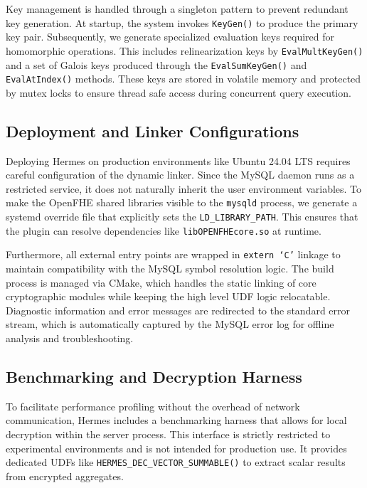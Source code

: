 \documentclass[sigconf,nonacm]{acmart}
\begin{document}
Key management is handled through a singleton pattern to prevent redundant key generation. At startup, the system invokes \texttt{KeyGen()} to produce the primary key pair. Subsequently, we generate specialized evaluation keys required for homomorphic operations. This includes relinearization keys by \texttt{EvalMultKeyGen()} and a set of Galois keys produced through the \texttt{EvalSumKeyGen()} and \texttt{EvalAtIndex()} methods. These keys are stored in volatile memory and protected by mutex locks to ensure thread safe access during concurrent query execution.

\subsection{Deployment and Linker Configurations}

Deploying Hermes on production environments like Ubuntu 24.04 LTS requires careful configuration of the dynamic linker. Since the MySQL daemon runs as a restricted service, it does not naturally inherit the user environment variables. To make the OpenFHE shared libraries visible to the \texttt{mysqld} process, we generate a systemd override file that explicitly sets the \texttt{LD\_LIBRARY\_PATH}. This ensures that the plugin can resolve dependencies like \texttt{libOPENFHEcore.so} at runtime.

Furthermore, all external entry points are wrapped in \texttt{extern `C'} linkage to maintain compatibility with the MySQL symbol resolution logic. The build process is managed via CMake, which handles the static linking of core cryptographic modules while keeping the high level UDF logic relocatable. Diagnostic information and error messages are redirected to the standard error stream, which is automatically captured by the MySQL error log for offline analysis and troubleshooting.

\subsection{Benchmarking and Decryption Harness}

To facilitate performance profiling without the overhead of network communication, Hermes includes a benchmarking harness that allows for local decryption within the server process. This interface is strictly restricted to experimental environments and is not intended for production use. It provides dedicated UDFs like \texttt{HERMES\_DEC\_VECTOR\_SUMMABLE()} to extract scalar results from encrypted aggregates.
\end{document}
